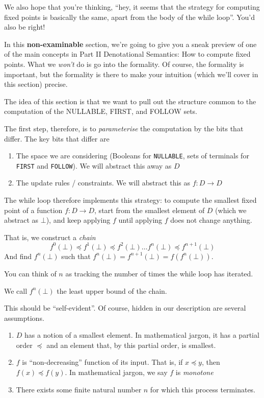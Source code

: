 We also hope that you're thinking, ``hey, it seems that the strategy for computing fixed points is basically the same, apart from the body of the while loop''. You'd also be right!

In this \textsf{\textbf{non-examinable}} section, we're going to give you a sneak preview of one of the main concepts in \textsf{Part II Denotational Semantics}: How to compute fixed points. What we \textit{won't} do is go into the formality. Of course, the formality is important, but the formality is there to make your intuition (which we'll cover in this section) precise.

The idea of this section is that we want to pull out the structure common to the computation of the \textsf{NULLABLE}, \textsf{FIRST}, and \textsf{FOLLOW} sets. 

The first step, therefore, is to \textit{parameterise} the computation by the bits that differ. The key bits that differ are 

\begin{enumerate}
    \item The space we are considering (Booleans for \texttt{NULLABLE}, sets of terminals for \texttt{FIRST} and \texttt{FOLLOW}). We will abstract this away as $D$
    \item The update rules / constraints. We will abstract this as $f: D \rightarrow D$
\end{enumerate}

The while loop therefore implements this strategy: to compute the smallest fixed point of a function $f: D \rightarrow D$, start from the smallest element of $D$ (which we abstract as $\bot$), and keep applying $f$ until applying $f$ does not change anything. 

That is, we construct a \textit{chain} 
\[ f^0(\bot) \preceq f^1(\bot) \preceq f^2(\bot) \ldots f^n(\bot) \preceq f^{n+1}(\bot)\]
And find $f^n(\bot)$ such that $f^n(\bot) = f^{n+1}(\bot) = f(f^n(\bot))$.

You can think of $n$ as tracking the number of times the while loop has iterated. 

We call $f^n(\bot)$ the least upper bound of the chain.

This should be ``self-evident''. Of course, hidden in our description are several assumptions.

\begin{enumerate}
    \item $D$ has a notion of a smallest element. In mathematical jargon, it has a partial order $\preceq$ and an element that, by this partial order, is smallest.
    \item $f$ is ``non-decreasing'' function of its input. That is, if $x \preceq y$, then $f(x) \preceq f(y)$. In mathematical jargon, we say $f$ is \textit{monotone}
    \item There exists some finite natural number $n$ for which this process terminates.
\end{enumerate}

